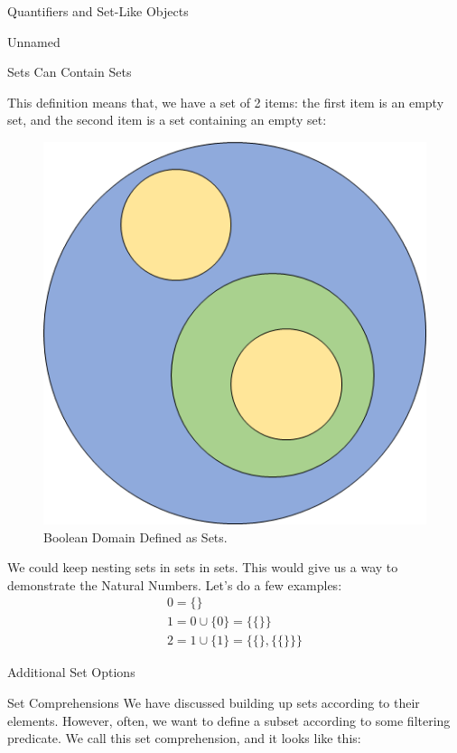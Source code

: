 \begin{part}{Quantifiers and Set-Like Objects}
\begin{chapter}{Unnamed}
\begin{section}{Sets Can Contain Sets}
            \begin{samepage}
                This definition means that, we have a set of 2 items: the first item is an empty set, and the second item is a set containing an empty set:
                \begin{figure}[ht]
                    \centering
                    \includegraphics[scale=0.5]{Sets/BooleansAsSets}
                    \caption{Boolean Domain Defined as Sets.}
                    \label{fig:BooleanDomainDefinedAsSets}
                \end{figure}
            \end{samepage}
            
            We could keep nesting sets in sets in sets. This would give us a way to demonstrate the Natural Numbers. Let's do a few examples:
            \begin{gather*}
                0 = \{ \} \\
                1 = 0 \cup \{ 0 \} = \{ \{ \} \} \\
                2 = 1 \cup \{ 1 \} = \{ \{ \}, \{ \{ \} \} \}
            \end{gather*}
        \end{section}
        \begin{section}{Additional Set Options}
            \begin{subsection}{Set Comprehensions}
                We have discussed building up sets according to their elements. However, often, we want to define a subset according to some filtering predicate. We call this set comprehension, and it looks like this:
                

\end{subsection}
\end{section}
\end{chapter}
\end{part}
